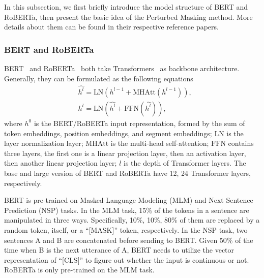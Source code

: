 \documentclass[11pt]{article}
\begin{document}
In this subsection, we first briefly introduce the model structure of BERT and RoBERTa, then present the basic idea of the Perturbed Masking method. More details about them can be found in their respective reference papers.


\subsubsection{BERT and RoBERTa}
BERT~\citep{DBLP:conf/naacl/DevlinCLT19} and RoBERTa~\citep{DBLP:journals/corr/abs-1907-11692} both take Transformers~\citep{DBLP:conf/nips/VaswaniSPUJGKP17} as backbone architecture. Generally, they can be formulated as the following equations
\begin{align}
   & \hat{h^l} = \mathrm{LN}(h^{l-1} + \mathrm{MHAtt}(h^{l-1})), \\
   & h^l = \mathrm{LN}(\hat{h^l} + \mathrm{FFN}(\hat{h^l})),
\end{align}
where $h^0$ is the BERT/RoBERTa input representation,  formed by the sum of token embeddings, position embeddings, and segment embeddings; $\mathrm{LN}$ is the layer normalization layer; $\mathrm{MHAtt}$ is the multi-head self-attention; $\mathrm{FFN}$ contains three layers, the first one is a linear projection layer, then an activation layer, then another linear projection layer; $l$ is the depth of Transformer layers. The base and large version of BERT and RoBERTa have 12, 24 Transformer layers, respectively.


BERT is pre-trained on Masked Language Modeling (MLM) and Next Sentence Prediction (NSP) tasks. In the MLM task, 15\% of the tokens in a sentence are manipulated in three ways. Specifically, 10\%, 10\%, 80\% of them are replaced by a random token, itself, or a ``[MASK]'' token, respectively. In the NSP task, two sentences A and B are concatenated before sending to BERT. Given 50\% of the time when B is the next utterance of A, BERT needs to utilize the vector representation of ``[CLS]'' to figure out whether the input is continuous or not. RoBERTa is only pre-trained on the MLM task.
\end{document}
